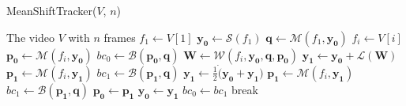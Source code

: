 \documentclass[11pt]{article}
\begin{document}
\begin{algorithm}
	\caption{MeanShiftTracker($V$, $n$)}
	\begin{algorithmic}[1]
	\REQUIRE The video $V$ with $n$ frames
	\STATE $f_1 \leftarrow V[1]$ 
	\STATE $\mathbf{y_0} \leftarrow \mathcal{S}(f_1)$ 
	\STATE $\mathbf{q} \leftarrow \mathcal{M}(f_1, \mathbf{y_0})$ 
		\STATE $f_i \leftarrow V[i]$
		\STATE $\mathbf{p_0} \leftarrow \mathcal{M}(f_i, \mathbf{y_0})$
		\STATE $bc_0 \leftarrow \mathcal{B}(\mathbf{p_0}, \mathbf{q})$ 
			\STATE $\mathbf{W} \leftarrow \mathcal{W}(f_i, \mathbf{y_0}, \mathbf{q}, \mathbf{p_0})$ 
			\STATE $\mathbf{y_1} \leftarrow \mathbf{y_0} + \mathcal{L}(\mathbf{W})$ 
			\STATE $\mathbf{p_1} \leftarrow \mathcal{M}(f_i, \mathbf{y_1})$
			\STATE $bc_1 \leftarrow \mathcal{B}(\mathbf{p_1}, \mathbf{q})$
				\STATE $\mathbf{y_1} \leftarrow \frac{1}{2} \dot (\mathbf{y_0} + \mathbf{y_1})$ 
				\STATE $\mathbf{p_1} \leftarrow \mathcal{M}(f_i, \mathbf{y_1})$
				\STATE $bc_1 \leftarrow \mathcal{B}(\mathbf{p_1}, \mathbf{q})$
			\ENDWHILE
			\STATE $\mathbf{p_0} \leftarrow \mathbf{p_1}$
			\STATE $\mathbf{y_0} \leftarrow \mathbf{y_1}$
			\STATE $bc_0 \leftarrow bc_1$
				\STATE break 
			\ENDIF
		\ENDWHILE
	\ENDFOR
	\medskip
	\end{algorithmic}
\label{alg:mst}
\end{algorithm}

\newpage
\end{document}
